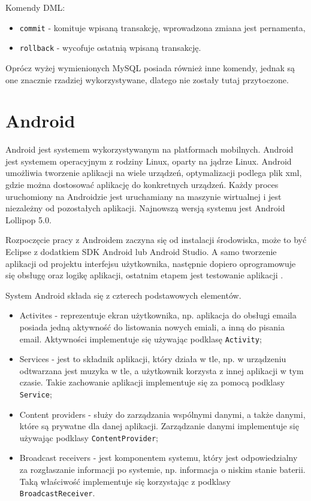 \documentclass[eng,printmode,oneside]{mgr}
\begin{document}
Komendy DML:
\begin{itemize}
  \item \texttt{commit} - komituje wpisaną transakcję, wprowadzona zmiana jest
  pernamenta,
  \item \texttt{rollback} - wycofuje ostatnią wpisaną transakcję.
\end{itemize}

Oprócz wyżej wymienionych MySQL posiada również inne komendy, jednak są one
znacznie rzadziej wykorzystywane, dlatego nie zostały tutaj przytoczone.

\newpage
\section{Android}

Android jest systemem wykorzystywanym na platformach mobilnych. Android
jest systemem operacyjnym z rodziny Linux, oparty na jądrze Linux. Android
umożliwia tworzenie aplikacji na wiele urządzeń, optymalizacji podlega plik xml,
gdzie można dostosować aplikację do konkretnych urządzeń. Każdy proces
uruchomiony na Androidzie jest uruchamiany na maszynie wirtualnej i jest
niezależny od pozostałych aplikacji. Najnowszą wersją systemu jest Android
Lollipop 5.0.

Rozpoczęcie pracy z Androidem zaczyna się od instalacji środowiska, może to być
Eclipse z dodatkiem SDK Android lub Android Studio. A samo tworzenie aplikacji
od projektu interfejsu użytkownika, następnie dopiero oprogramowuje się
obsługę oraz logikę aplikacji, ostatnim etapem jest testowanie aplikacji
\cite{developer.android}.

System Android składa się z czterech podstawowych elementów. 

\begin{itemize}
  \item Activites - reprezentuje ekran użytkownika, np. aplikacja do obsługi
  emaila posiada jedną aktywność do listowania nowych emiali, a inną
  do pisania email. Aktywności implementuje się używając
  podklasę \texttt{Activity};
  \item Services - jest to składnik aplikacji, który działa w tle, np. w
  urządzeniu odtwarzana jest muzyka w tle, a użytkownik korzysta z innej
  aplikacji w tym czasie. Takie zachowanie aplikacji implementuje się za pomocą
  podklasy \texttt{Service};
  \item Content providers - służy do zarządzania wspólnymi danymi, a także
  danymi, które są prywatne dla danej aplikacji. Zarządzanie danymi
  implementuje się używając podklasy \texttt{ContentProvider};
  \item Broadcast receivers - jest komponentem systemu, który jest
  odpowiedzialny za rozgłaszanie informacji po systemie, np. informacja o
  niskim stanie baterii. Taką właściwość implementuje się korzystając z podklasy
  \texttt{BroadcastReceiver}.
\end{itemize}
\end{document}

